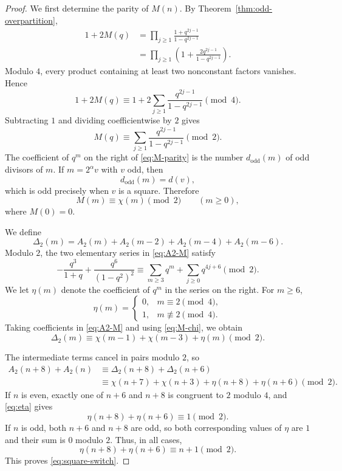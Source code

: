 \documentclass[10pt,a4paper]{amsart}
\begin{document}
\begin{proof}
We first determine the parity of $M(n)$.  By Theorem~\ref{thm:odd-overpartition},
\begin{align*}
 1+2M(q)
 &=\prod_{j\geq1}
 \frac{1+q^{2j-1}}{1-q^{2j-1}}\\
 &=\prod_{j\geq1}
 \left(1+\frac{2q^{2j-1}}{1-q^{2j-1}}\right).
\end{align*}
Modulo $4$, every product containing at least two nonconstant factors vanishes.  Hence
\[
 1+2M(q)
 \equiv1+2\sum_{j\geq1}
 \frac{q^{2j-1}}{1-q^{2j-1}}\pmod4.
\]
Subtracting $1$ and dividing coefficientwise by $2$ gives
\begin{equation}\label{eq:M-parity}
 M(q)\equiv\sum_{j\geq1}
 \frac{q^{2j-1}}{1-q^{2j-1}}\pmod2.
\end{equation}
The coefficient of $q^m$ on the right of \eqref{eq:M-parity} is the number $d_{\mathrm{odd}}(m)$ of odd divisors of $m$.  If $m=2^\alpha v$ with $v$ odd, then
\[
 d_{\mathrm{odd}}(m)=d(v),
\]
which is odd precisely when $v$ is a square.  Therefore
\begin{equation}\label{eq:M-chi}
 M(m)\equiv\chi(m)\pmod2
 \qquad(m\geq0),
\end{equation}
where $M(0)=0$.

We define
\[
 \Delta_2(m)=A_2(m)+A_2(m-2)+A_2(m-4)+A_2(m-6).
\]
Modulo $2$, the two elementary series in \eqref{eq:A2-M} satisfy
\[
 -\frac{q^3}{1+q}+\frac{q^6}{(1-q^2)^2}
 \equiv\sum_{m\geq3}q^m+\sum_{j\geq0}q^{4j+6}\pmod2.
\]
We let $\eta(m)$ denote the coefficient of $q^m$ in the series on the right.  For $m\geq6$,
\begin{equation}\label{eq:eta}
 \eta(m)=
 \begin{cases}
 0,&m\equiv2\pmod4,\\
 1,&m\not\equiv2\pmod4.
 \end{cases}
\end{equation}
Taking coefficients in \eqref{eq:A2-M} and using \eqref{eq:M-chi}, we obtain
\begin{equation}\label{eq:Delta-parity}
 \Delta_2(m)
 \equiv\chi(m-1)+\chi(m-3)+\eta(m)\pmod2.
\end{equation}

The intermediate terms cancel in pairs modulo $2$, so
\begin{align*}
 A_2(n+8)+A_2(n)
 &\equiv\Delta_2(n+8)+\Delta_2(n+6)\\
 &\equiv\chi(n+7)+\chi(n+3)
   +\eta(n+8)+\eta(n+6)\pmod2.
\end{align*}
If $n$ is even, exactly one of $n+6$ and $n+8$ is congruent to $2$ modulo $4$, and \eqref{eq:eta} gives
\[
 \eta(n+8)+\eta(n+6)\equiv1\pmod2.
\]
If $n$ is odd, both $n+6$ and $n+8$ are odd, so both corresponding values of $\eta$ are $1$ and their sum is $0$ modulo $2$.  Thus, in all cases,
\[
 \eta(n+8)+\eta(n+6)\equiv n+1\pmod2.
\]
This proves \eqref{eq:square-switch}.


\end{proof}
\end{document}
